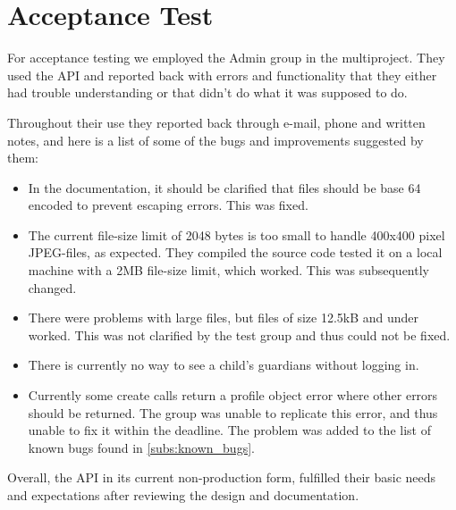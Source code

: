 \section{Acceptance Test}
For acceptance testing we employed the Admin group in the multiproject. They used the API and reported back with errors and functionality that they either had trouble understanding or that didn't do what it was supposed to do. 

Throughout their use they reported back through e-mail, phone and written notes, and here is a list of some of the bugs and improvements suggested by them:

\begin{itemize}
\item In the documentation, it should be clarified that files should be base 64 encoded to prevent escaping errors. This was fixed.
\item The current file-size limit of 2048 bytes is too small to handle 400x400 pixel JPEG-files, as expected. They compiled the source code tested it on a local machine with a 2MB file-size limit, which worked. This was subsequently changed.
\item There were problems with large files, but files of size 12.5kB and under worked. This was not clarified by the test group and thus could not be fixed.
\item There is currently no way to see a child's guardians without logging in.
\item Currently some create calls return a profile object error where other errors should be returned. The group was unable to replicate this error, and thus unable to fix it within the deadline. The problem was added to the list of known bugs found in \autoref{subs:known_bugs}.
\end{itemize}

Overall, the API in its current non-production form, fulfilled their basic needs and expectations after reviewing the design and documentation.